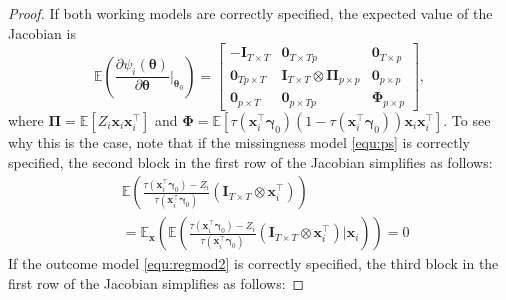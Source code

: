 \documentclass[10pt,a4paper]{amsart}
\newcommand{\IdenMat}{\textbf{I}}
\newcommand{\LogCoe}{\boldsymbol{\gamma}}
\newcommand{\ObsCov}{\textbf{x}_i}
\begin{document}
\begin{proof}
        If both working models are correctly specified, the expected value of the Jacobian is 
            \begin{equation*}
                \mathbb{E} \left( \frac{\partial \psi_i(\boldsymbol{\theta})}{ \partial \boldsymbol{\theta}} \biggr\rvert_{\boldsymbol{\theta}_0} \right) 
                    = \begin{bmatrix}
                    -\IdenMat_{T \times T} & \textbf{0}_{T \times Tp} & \textbf{0}_{T \times p}\\ 
                    \textbf{0}_{Tp \times T} & \IdenMat_{T \times T} \otimes \boldsymbol{\Pi}_{p \times p} & \textbf{0}_{p \times p}\\ 
                    \textbf{0}_{p \times T} & \textbf{0}_{p \times Tp} & \boldsymbol{\Phi}_{p \times p}
                    \end{bmatrix},
            \end{equation*}
        where $\boldsymbol{\Pi} = \mathbb{E}\left[ Z_i\textbf{x}_i\textbf{x}_i^{\top} \right]$ and $\boldsymbol{\Phi} = \mathbb{E}\left[\tau(\ObsCov^{\top} \LogCoe_0)(1-\tau(\ObsCov^{\top} \LogCoe_0)) \ObsCov\ObsCov^{\top}\right]$.
        To see why this is the case, note that if the missingness model \eqref{equ:ps} is correctly specified, the second block in the first row of the Jacobian simplifies as follows: 
            \begin{align*}
                & \mathbb{E}\left(\frac{\tau(\ObsCov^{\top} \LogCoe_0)- Z_i}{\tau(\ObsCov^{\top} \LogCoe_0)} (\IdenMat_{T \times T} \otimes \ObsCov^{\top})\right) \\
                &= \mathbb{E}_{\textbf{x}} \left( \mathbb{E} \left( \frac{\tau(\ObsCov^{\top} \LogCoe_0)- Z_i}{\tau(\ObsCov^{\top} \LogCoe_0)} (\IdenMat_{T \times T} \otimes \ObsCov^{\top}) \biggr\rvert \ObsCov \right) \right) = 0
            \end{align*}
        If the outcome model \eqref{equ:regmod2} is correctly specified, the third block in the first row of the Jacobian simplifies as follows:

\end{proof}
\end{document}
